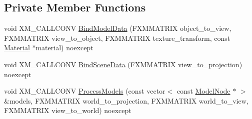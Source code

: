 \subsection*{Private Member Functions}
\begin{DoxyCompactItemize}
\item 
void X\+M\+\_\+\+C\+A\+L\+L\+C\+O\+NV \hyperlink{classmage_1_1_variable_component_pass_aefb199dd54c4701cd1e449592fe61cf9}{Bind\+Model\+Data} (F\+X\+M\+M\+A\+T\+R\+IX object\+\_\+to\+\_\+view, F\+X\+M\+M\+A\+T\+R\+IX view\+\_\+to\+\_\+object, F\+X\+M\+M\+A\+T\+R\+IX texture\+\_\+transform, const \hyperlink{structmage_1_1_material}{Material} $\ast$material) noexcept
\item 
void X\+M\+\_\+\+C\+A\+L\+L\+C\+O\+NV \hyperlink{classmage_1_1_variable_component_pass_a173b059d60e8c0cc9b08fea5e896d3ca}{Bind\+Scene\+Data} (F\+X\+M\+M\+A\+T\+R\+IX view\+\_\+to\+\_\+projection) noexcept
\item 
void X\+M\+\_\+\+C\+A\+L\+L\+C\+O\+NV \hyperlink{classmage_1_1_variable_component_pass_ab231c4d3a7992b3a11b17ecc12fb5fda}{Process\+Models} (const vector$<$ const \hyperlink{classmage_1_1_model_node}{Model\+Node} $\ast$ $>$ \&models, F\+X\+M\+M\+A\+T\+R\+IX world\+\_\+to\+\_\+projection, F\+X\+M\+M\+A\+T\+R\+IX world\+\_\+to\+\_\+view, F\+X\+M\+M\+A\+T\+R\+IX view\+\_\+to\+\_\+world) noexcept
\end{DoxyCompactItemize}
